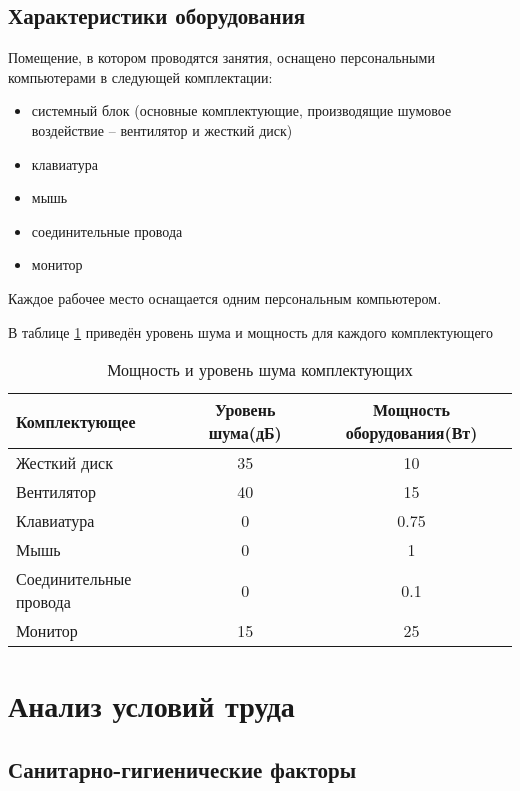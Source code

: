 \subsection{Характеристики оборудования}
\label{hobr}

Помещение, в котором проводятся занятия, оснащено персональными ком\-пьютерами в следующей комплектации:
\begin{itemize}
\item системный блок (основные комплектующие, производящие шумовое воз\-действие – вентилятор и жесткий диск)
\item клавиатура
\item мышь
\item соединительные провода
\item монитор
\end{itemize}

Каждое рабочее место оснащается одним персональным компьютером.

В таблице \ref{powercomp} приведён уровень шума и мощность для каждого комплек\-тующего

\begin{table}[H]
\caption{Мощность и уровень шума комплектующих\label{powercomp}}
\begin{center}
\begin{tabular}{|l|c|c|}
\hline
Комплектующее &Уровень шума(дБ) & Мощность оборудования(Вт)\\
\hline
Жесткий диск & 35 & 10\\
\hline
Вентилятор & 40 & 15\\
\hline
Клавиатура & 0 &  0.75\\
\hline
Мышь & 0 & 1 \\
\hline
Соединительные провода & 0 & 0.1 \\
\hline
Монитор & 15 & 25\\
\hline
\end{tabular}
\end{center}
\end{table}

\section{Анализ условий труда}

\subsection{Санитарно-гигиенические факторы}
\label{sangen}

